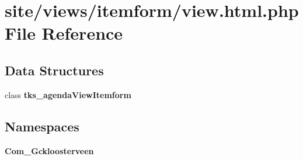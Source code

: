 \section{site/views/itemform/view.html.\+php File Reference}
\label{site_2views_2itemform_2view_8html_8php}
\subsection*{Data Structures}
\begin{DoxyCompactItemize}
\item 
class \textbf{ tks\+\_\+agenda\+View\+Itemform}
\end{DoxyCompactItemize}
\subsection*{Namespaces}
\begin{DoxyCompactItemize}
\item 
 \textbf{ Com\+\_\+\+Gckloosterveen}
\end{DoxyCompactItemize}
